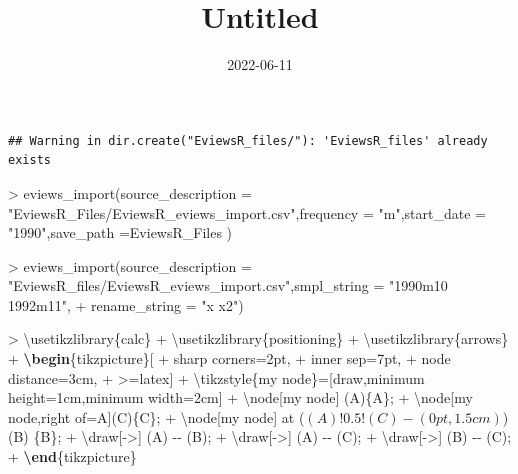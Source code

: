 \documentclass[
]{article}
\title{Untitled}
\author{}
\date{\vspace{-2.5em}2022-06-11}
\newenvironment{Shaded}{\begin{snugshade}}{\end{snugshade}}
\newcommand{\AttributeTok}[1]{\textcolor[rgb]{0.77,0.63,0.00}{#1}}
\newcommand{\ExtensionTok}[1]{#1}
\newcommand{\FunctionTok}[1]{\textcolor[rgb]{0.00,0.00,0.00}{#1}}
\newcommand{\KeywordTok}[1]{\textcolor[rgb]{0.13,0.29,0.53}{\textbf{#1}}}
\newcommand{\NormalTok}[1]{#1}
\newcommand{\SpecialCharTok}[1]{\textcolor[rgb]{0.00,0.00,0.00}{#1}}
\newcommand{\SpecialStringTok}[1]{\textcolor[rgb]{0.31,0.60,0.02}{#1}}
\newcommand{\StringTok}[1]{\textcolor[rgb]{0.31,0.60,0.02}{#1}}
\begin{document}
\maketitle

{
\setcounter{tocdepth}{2}
\tableofcontents
}
\begin{verbatim}
## Warning in dir.create("EviewsR_files/"): 'EviewsR_files' already exists
\end{verbatim}

\begin{Shaded}
\begin{Highlighting}[]
\SpecialCharTok{\textgreater{}} \FunctionTok{eviews\_import}\NormalTok{(}\AttributeTok{source\_description =} \StringTok{"EviewsR\_Files/EviewsR\_eviews\_import.csv"}\NormalTok{,}\AttributeTok{frequency =} \StringTok{"m"}\NormalTok{,}\AttributeTok{start\_date =} \StringTok{"1990"}\NormalTok{,}\AttributeTok{save\_path =}\StringTok{\textquotesingle{}EviewsR\_Files\textquotesingle{}}\NormalTok{ )}
\end{Highlighting}
\end{Shaded}

\begin{Shaded}
\begin{Highlighting}[]
\SpecialCharTok{\textgreater{}} \FunctionTok{eviews\_import}\NormalTok{(}\AttributeTok{source\_description =} \StringTok{"EviewsR\_files/EviewsR\_eviews\_import.csv"}\NormalTok{,}\AttributeTok{smpl\_string =} \StringTok{"1990m10 1992m11"}\NormalTok{,}
\SpecialCharTok{+} \AttributeTok{rename\_string =} \StringTok{"x x2"}\NormalTok{)}
\end{Highlighting}
\end{Shaded}

\begin{Shaded}
\begin{Highlighting}[]
\NormalTok{\textgreater{} }\FunctionTok{\textbackslash{}usetikzlibrary}\NormalTok{\{calc\}}
\NormalTok{+ }\FunctionTok{\textbackslash{}usetikzlibrary}\NormalTok{\{positioning\}}
\NormalTok{+ }\FunctionTok{\textbackslash{}usetikzlibrary}\NormalTok{\{arrows\}}
\NormalTok{+   }\KeywordTok{\textbackslash{}begin}\NormalTok{\{}\ExtensionTok{tikzpicture}\NormalTok{\}[}
\NormalTok{+     sharp corners=2pt,}
\NormalTok{+     inner sep=7pt,}
\NormalTok{+     node distance=3cm,}
\NormalTok{+     \textgreater{}=latex]}
\NormalTok{+ }\FunctionTok{\textbackslash{}tikzstyle}\NormalTok{\{my node\}=[draw,minimum height=1cm,minimum width=2cm]}
\NormalTok{+ }\FunctionTok{\textbackslash{}node}\NormalTok{[my node] (A)\{A\};}
\NormalTok{+ }\FunctionTok{\textbackslash{}node}\NormalTok{[my node,right of=A](C)\{C\};}
\NormalTok{+ }\FunctionTok{\textbackslash{}node}\NormalTok{[my node] at (}\SpecialStringTok{$(A)!0.5!(C){-}(0pt,1.5cm)$}\NormalTok{) (B) \{B\};}
\NormalTok{+ }\FunctionTok{\textbackslash{}draw}\NormalTok{[{-}\textgreater{}] (A) {-}{-} (B);}
\NormalTok{+ }\FunctionTok{\textbackslash{}draw}\NormalTok{[{-}\textgreater{}] (A) {-}{-} (C);}
\NormalTok{+ }\FunctionTok{\textbackslash{}draw}\NormalTok{[{-}\textgreater{}] (B) {-}{-} (C);}
\NormalTok{+ }\KeywordTok{\textbackslash{}end}\NormalTok{\{}\ExtensionTok{tikzpicture}\NormalTok{\}}
\end{Highlighting}
\end{Shaded}
\end{document}
